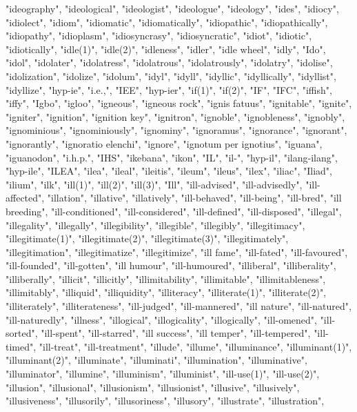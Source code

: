 "ideography",
"ideological",
"ideologist",
"ideologue",
"ideology",
"ides",
"idiocy",
"idiolect",
"idiom",
"idiomatic",
"idiomatically",
"idiopathic",
"idiopathically",
"idiopathy",
"idioplasm",
"idiosyncrasy",
"idiosyncratic",
"idiot",
"idiotic",
"idiotically",
"idle(1)",
"idle(2)",
"idleness",
"idler",
"idle wheel",
"idly",
"Ido",
"idol",
"idolater",
"idolatress",
"idolatrous",
"idolatrously",
"idolatry",
"idolise",
"idolization",
"idolize",
"idolum",
"idyl",
"idyll",
"idyllic",
"idyllically",
"idyllist",
"idyllize",
"hyp-ie",
"i.e.,",
"IEE",
"hyp-ier",
"if(1)",
"if(2)",
"IF",
"IFC",
"iffish",
"iffy",
"Igbo",
"igloo",
"igneous",
"igneous rock",
"ignis fatuus",
"ignitable",
"ignite",
"igniter",
"ignition",
"ignition key",
"ignitron",
"ignoble",
"ignobleness",
"ignobly",
"ignominious",
"ignominiously",
"ignominy",
"ignoramus",
"ignorance",
"ignorant",
"ignorantly",
"ignoratio elenchi",
"ignore",
"ignotum per ignotius",
"iguana",
"iguanodon",
"i.h.p.",
"IHS",
"ikebana",
"ikon",
"IL",
"il-",
"hyp-il",
"ilang-ilang",
"hyp-ile",
"ILEA",
"ilea",
"ileal",
"ileitis",
"ileum",
"ileus",
"ilex",
"iliac",
"Iliad",
"ilium",
"ilk",
"ill(1)",
"ill(2)",
"ill(3)",
"Ill",
"ill-advised",
"ill-advisedly",
"ill-affected",
"illation",
"illative",
"illatively",
"ill-behaved",
"ill-being",
"ill-bred",
"ill breeding",
"ill-conditioned",
"ill-considered",
"ill-defined",
"ill-disposed",
"illegal",
"illegality",
"illegally",
"illegibility",
"illegible",
"illegibly",
"illegitimacy",
"illegitimate(1)",
"illegitimate(2)",
"illegitimate(3)",
"illegitimately",
"illegitimation",
"illegitimatize",
"illegitimize",
"ill fame",
"ill-fated",
"ill-favoured",
"ill-founded",
"ill-gotten",
"ill humour",
"ill-humoured",
"illiberal",
"illiberality",
"illiberally",
"illicit",
"illicitly",
"illimitability",
"illimitable",
"illimitableness",
"illimitably",
"illiquid",
"illiquidity",
"illiteracy",
"illiterate(1)",
"illiterate(2)",
"illiterately",
"illiterateness",
"ill-judged",
"ill-mannered",
"ill nature",
"ill-natured",
"ill-naturedly",
"illness",
"illogical",
"illogicality",
"illogically",
"ill-omened",
"ill-sorted",
"ill-spent",
"ill-starred",
"ill success",
"ill temper",
"ill-tempered",
"ill-timed",
"ill-treat",
"ill-treatment",
"illude",
"illume",
"illuminance",
"illuminant(1)",
"illuminant(2)",
"illuminate",
"illuminati",
"illumination",
"illuminative",
"illuminator",
"illumine",
"illuminism",
"illuminist",
"ill-use(1)",
"ill-use(2)",
"illusion",
"illusional",
"illusionism",
"illusionist",
"illusive",
"illusively",
"illusiveness",
"illusorily",
"illusoriness",
"illusory",
"illustrate",
"illustration",
